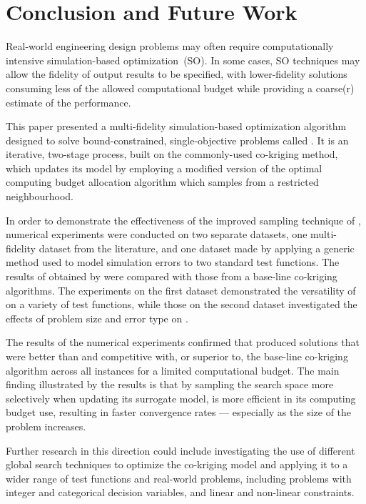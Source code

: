 \section{Conclusion and Future Work}\label{sec:conc}
Real-world engineering design problems may often require computationally intensive simulation-based optimization~(SO). In some cases, SO techniques may allow the fidelity of output results to be specified, with lower-fidelity solutions consuming less of the allowed computational budget while providing a coarse(r) estimate of the performance.

This paper presented a multi-fidelity simulation-based optimization algorithm designed to solve bound-constrained, single-objective problems called \AlgName{}. It is an iterative, two-stage process, built on the commonly-used co-kriging method, which updates its model by employing a modified version of the optimal computing budget allocation algorithm which samples from a restricted neighbourhood.  

In order to demonstrate the effectiveness of the improved sampling technique of \AlgName{}, numerical experiments were conducted on two separate datasets, one multi-fidelity dataset from the literature, and one dataset made by applying a generic method used to model simulation errors to two standard test functions. The results of obtained by \AlgName{} were compared with those from a base-line co-kriging  \motos{} algorithms.  The experiments on the first dataset demonstrated the versatility of \AlgName{} on a variety of test functions, while those on the second dataset investigated the effects of problem size and error type on \AlgName{}.

The results of the numerical experiments confirmed that \AlgName{} produced solutions that were better than \motos{} and competitive with, or superior to, the base-line co-kriging algorithm across all instances for a limited computational budget. The main finding illustrated by the results is that by sampling the search space more selectively when updating its surrogate model, \AlgName{} is more efficient in its computing budget use, resulting in faster convergence rates --- especially as the size of the problem increases.

Further research in this direction could include investigating the use of different global search techniques to optimize the co-kriging model and applying it to a wider range of test functions and real-world problems, including problems with integer and categorical decision variables, and linear and non-linear constraints.